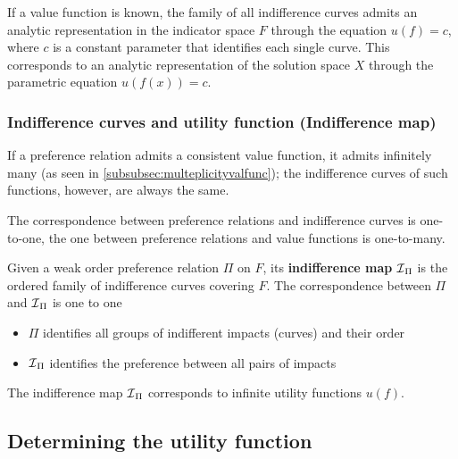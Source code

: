 If a value function is known, the family of all indifference curves admits an analytic representation in the indicator space $F$ through the equation $u(f) = c$, where $c$ is a constant parameter that identifies each single curve. This corresponds to an analytic representation of the solution space $X$ through the parametric equation $u(f(x)) = c$.

\subsubsection{Indifference curves and utility function (Indifference map)}

If a preference relation admits a consistent value function, it admits infinitely many (as seen in \ref{subsubsec:multeplicityvalfunc}); the indifference curves of such functions, however, are always the same. 

The correspondence between preference relations and indifference curves is one-to-one, the one between preference relations and value functions is one-to-many.

Given a weak order preference relation $\Pi$ on $F$, its \textbf{indifference map} $\operatorname{\mathcal{I}}_\Pi$ is the ordered family of indifference curves covering $F$. The correspondence between $\Pi$ and $\operatorname{\mathcal{I}}_\Pi$ is one to one
\begin{itemize}
	\item $\Pi$ identifies all groups of indifferent impacts (curves) and their order
	
	\item $\operatorname{\mathcal{I}}_\Pi$ identifies the preference between all pairs of impacts
\end{itemize}

The indifference map $\operatorname{\mathcal{I}}_\Pi$ corresponds to infinite utility functions $u(f)$.

\subsection{Determining the utility function}


